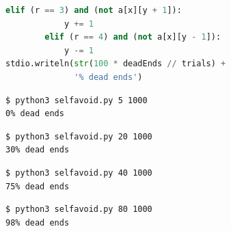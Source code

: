 \documentclass[8pt,a4paper,compress]{beamer}
\begin{document}
\begin{frame}[fragile]
\pause

\begin{lstlisting}[language=Python,style=focusin]
        elif (r == 3) and (not a[x][y + 1]):
            y += 1
        elif (r == 4) and (not a[x][y - 1]):
            y -= 1
stdio.writeln(str(100 * deadEnds // trials) + 
              '% dead ends')
\end{lstlisting}

\pause\bigskip

\begin{lstlisting}[language={},style=focusin]
$ python3 selfavoid.py 5 1000
0% dead ends
\end{lstlisting}

\pause\bigskip

\begin{lstlisting}[language={},style=focusin]
$ python3 selfavoid.py 20 1000
30% dead ends
\end{lstlisting}

\pause\bigskip

\begin{lstlisting}[language={}]
$ python3 selfavoid.py 40 1000
75% dead ends
\end{lstlisting}

\pause\bigskip

\begin{lstlisting}[language={},style=focusin]
$ python3 selfavoid.py 80 1000
98% dead ends
\end{lstlisting}
\end{frame}
\end{document}
